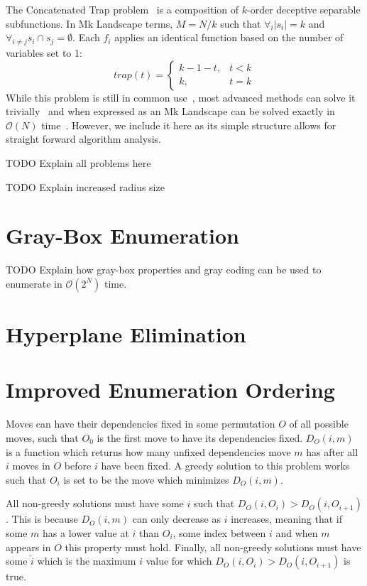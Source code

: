 \documentclass[runningheads,a4paper]{llncs}
\newcommand{\BigO}[1]{$\mathcal{O}{(#1)}$}
\begin{document}
The Concatenated Trap problem~\cite{deb:1992:trap} is a composition of $k$-order deceptive
separable subfunctions. In Mk Landscape terms, $M=N/k$ such that $\forall_i |s_i| = k$ and
$\forall_{i \neq j} s_i \cap s_j = \emptyset$. Each $f_i$ applies an identical function based
on the number of variables set to 1:
\begin{equation}
   trap(t) = \left\{
     \begin{array}{rl}
       k-1-t, &  t<k\\
       k,   &  t = k
     \end{array}
   \right.
  \label{eq-trap}
\end{equation}
While this problem is still in common use~\cite{hsu:2015:dsmgaII,inoue:2015:adaptivep3},
most advanced methods can solve it trivially~\cite{goldman:2012:ltga} and when expressed
as an Mk Landscape can be solved exactly in \BigO{N} time~\cite{whitley:2015:mk}. However,
we include it here as its simple structure allows for straight forward algorithm analysis.

TODO Explain all problems here

TODO Explain increased radius size~\cite{chicano:2014:ball}

\section{Gray-Box Enumeration}
TODO Explain how gray-box properties and gray coding can be used to
enumerate in \BigO{2^N} time.~\cite{ochoa:2015:crossovernetworks}

\section{Hyperplane Elimination}

\section{Improved Enumeration Ordering}

Moves can have their dependencies fixed in some permutation $O$ of all possible moves,
such that $O_0$ is the first move to have its dependencies fixed.
$D_O(i, m)$ is a function which returns how many unfixed dependencies move $m$ has after all
$i$ moves in $O$ before $i$ have been fixed. A greedy solution to this problem works such
that $O_i$ is set to be the move which minimizes $D_O(i, m)$.

All non-greedy solutions must have some $i$ such that $D_O(i, O_i) > D_O(i, O_{i+1})$.
This is because $D_O(i, m)$ can only decrease as $i$ increases, meaning that if some $m$
has a lower value at $i$ than $O_i$, some index between $i$ and when $m$ appears in $O$
this property must hold. Finally, all non-greedy solutions must have some $\hat{i}$
which is the maximum $i$ value for which $D_O(i, O_i) > D_O(i, O_{i+1})$ is true. 
\end{document}
